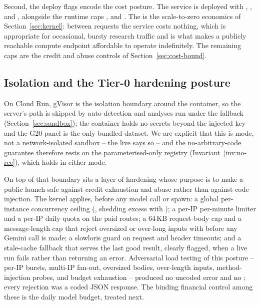 Second, the deploy flags encode the cost posture. The service is deployed with
, ,  and
, alongside the runtime caps ,
 and . The  is the scale-to-zero economics of Section~\ref{sec:kernel}: between requests the
service costs nothing, which is appropriate for occasional, bursty research traffic
and is what makes a publicly reachable compute endpoint affordable to operate
indefinitely. The remaining caps are the credit and abuse controls of
Section~\ref{sec:cost-bound}.

\subsection{Isolation and the Tier-0 hardening posture}
\label{sec:hardening}

On Cloud Run, gVisor is the isolation boundary around the container, so the server's
 path is skipped by auto-detection and analyses run under the
 fallback (Section~\ref{sec:sandbox}); the container holds no secrets
beyond the injected key and the G20 panel is the only bundled dataset. We are
explicit that this is  mode, not a network-isolated 
sandbox -- the live  says so -- and the no-arbitrary-code guarantee
therefore rests on the parameterised-only registry (Invariant~\ref{inv:no-rce}),
which holds in either mode.

On top of that boundary sits a layer of hardening whose purpose is to make a public
launch safe against credit exhaustion and abuse rather than against code injection.
The kernel applies, before any model call or spawn: a global per-instance
concurrency ceiling (, shedding excess with ); a
per-IP per-minute limiter and a per-IP daily quota on the paid routes; a 64\,KB
request-body cap and a message-length cap that reject oversized or over-long inputs
with  before any Gemini call is made; a slowloris guard on request and
header timeouts; and a stale-cache fallback that serves the last good result,
clearly flagged, when a live run fails rather than returning an error. Adversarial
load testing of this posture -- per-IP bursts, multi-IP fan-out, oversized bodies,
over-length inputs, method-injection probes, and budget exhaustion -- produced no
uncoded error and no ; every rejection was a coded JSON response. The
binding financial control among these is the daily model budget, treated next.

